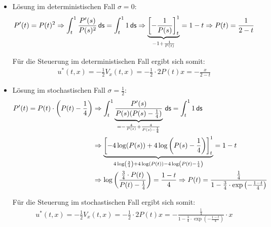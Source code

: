 \documentclass[a4paper, 12pt]{scrartcl}
\newcommand{\ds}{\thinspace \mathsf{ds}}
\begin{document}
\begin{beispiel}
    \begin{itemize}
        \item[1.] Lösung im deterministischen Fall $\sigma = 0$:
        \begin{align*}
            P'(t) = P(t)^2 
            \Rightarrow
            \int_t^1 \frac{P'(s)}{P(s)^2} \ds = \int_t^1 1 \ds
            \Rightarrow
            \underbrace{
                \left[
                    -\frac{1}{P(s)}
                \right]_t^1
            }_{-1 + \frac{1}{P(t)}} = 1 - t 
            \Rightarrow
            P(t) = \frac{1}{2 - t}
        \end{align*}

        Für die Steuerung im deterministischen Fall ergibt sich somit:
        \begin{align*}
            u^*(t,x) = -\frac{1}{2} V_x(t,x) = -\frac{1}{2} \cdot 2 P(t) x = -\frac{x}{2 - t}
        \end{align*}
        \item[2.] Lösung im stochastischen Fall $\sigma = \frac{1}{2}$: 
        \begin{align*}
            P'(t) = P(t) \cdot \left(P(t) - \frac{1}{4} \right)
            &\Rightarrow
            \int_t^1 
            \underbrace{
                \frac{P'(s)}{P(s)(P(s) - \frac{1}{4})}
            }_{
                = -\frac{4}{P(s)} + \frac{4}{P(s) - \frac{1}{4}}
            }
            \ds = \int_t^1 1 \ds
            \\
            &\Rightarrow
            \underbrace{
                \left[
                    -4 \log(P(s)) + 4 \log\left(P(s) - \frac{1}{4}\right)
                \right]_t^1
            }_{4 \log\left(\frac{3}{4}\right) + 4 \log(P(t)) - 4 \log\left(P(t) - \frac{1}{4}\right)} = 1 - t 
            \\
            &\Rightarrow
            \log\left( \frac{\frac{3}{4} \cdot P(t)}{P(t) - \frac{1}{4}} \right)
            =
            \frac{1-t}{4}
            \Rightarrow
            P(t) = \frac{\frac{1}{4}}{1 - \frac{3}{4} \cdot \exp\left(-\frac{1-t}{4}\right)}
        \end{align*}

        Für die Steuerung im stochastischen Fall ergibt sich somit:
        \begin{align*}
            u^*(t,x) = -\frac{1}{2} V_x(t,x) = -\frac{1}{2} \cdot 2 P(t) x 
            = -\frac{\frac{1}{4}}{1 - \frac{3}{4} \cdot \exp\left(-\frac{1-t}{4}\right)} \cdot x
        \end{align*}
    \end{itemize}
\end{beispiel}
\end{document}
